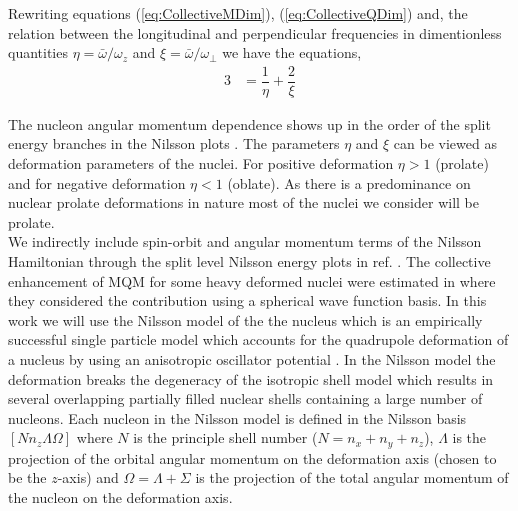 \documentclass[10pt,a4paper, twoside]{report}
\begin{document}
Rewriting equations (\ref{eq:CollectiveMDim}), (\ref{eq:CollectiveQDim})  and, the relation between the longitudinal  and perpendicular frequencies in dimentionless quantities $\eta = \bar{\omega}/\omega_z$ and $\xi = \bar{\omega}/\omega_{\perp}$ we have the equations,
\begin{align}
3 &= \dfrac{1}{\eta} + \dfrac{2}{\xi} \label{eq:average} 
\end{align}

The nucleon angular momentum dependence shows up in the order of the split energy branches in the Nilsson plots \cite{Nilsson1955, BohrMottVol2}.
The parameters $\eta$ and $\xi$ can be viewed as deformation parameters of the nuclei. For positive deformation $\eta > 1$ (prolate) and for negative deformation $\eta < 1$ (oblate). As there is a predominance on nuclear prolate deformations in nature most of the nuclei we consider will be prolate. \\


We indirectly include spin-orbit and angular momentum terms of the Nilsson Hamiltonian through the split level Nilsson energy plots in ref. \cite{BohrMottVol2}.
The collective enhancement of MQM for some  heavy deformed nuclei were estimated in \cite{Flambaum1994, Flambaum2014} where they considered the contribution using a spherical wave function basis. In this work we will use the Nilsson model of the the nucleus  which is an empirically successful single particle model which accounts for the quadrupole deformation of a nucleus by using an anisotropic oscillator potential \cite{Nilsson1955, Mottelson1955, BohrMottVol2}. In the Nilsson model the deformation breaks the degeneracy of the isotropic shell model which results in several overlapping partially filled nuclear shells containing a large number of nucleons.  Each nucleon in the Nilsson model is defined in the Nilsson basis $\left[Nn_z\Lambda\Omega\right]$ where $N$ is the principle shell number ($N = n_x + n_y + n_z$), $\Lambda$ is the projection of the orbital angular momentum on the deformation axis (chosen to be the $z$-axis) and $\Omega = \Lambda + \Sigma$ is the projection of the total angular momentum of the nucleon on the deformation axis.
\end{document}
